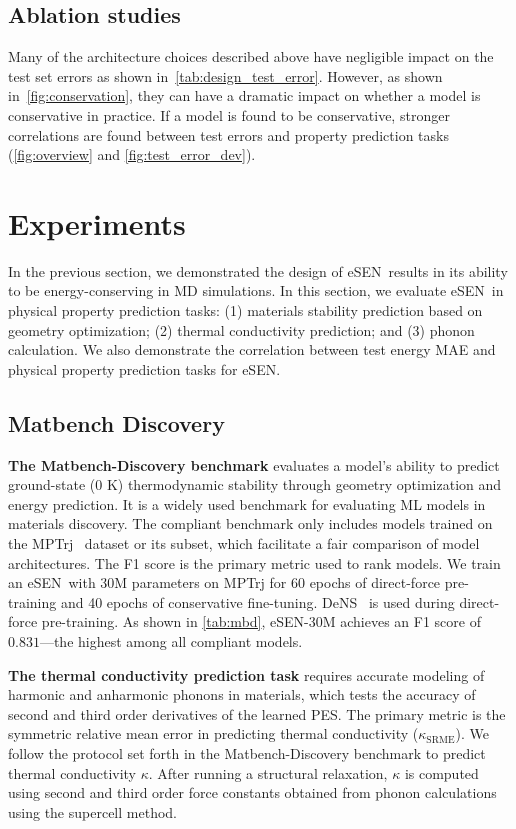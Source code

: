 \documentclass[twocolumn]{fairmeta}
\newcommand{\ourmodel}{eSEN}
\begin{document}
\subsection{Ablation studies}
Many of the architecture choices described above have negligible impact on the test set errors as shown in~\cref{tab:design_test_error}. However, as shown in~\cref{fig:conservation}, they can have a dramatic impact on whether a model is conservative in practice. If a model is found to be conservative, stronger correlations are found between test errors and property prediction tasks (\cref{fig:overview} and \cref{fig:test_error_dev}). 

\section{Experiments}
\label{sec:experiment}


In the previous section, we demonstrated the design of \ourmodel\ results in its ability to be energy-conserving in MD simulations. In this section, we evaluate \ourmodel\ in physical property prediction tasks: (1) materials stability prediction based on geometry optimization; (2) thermal conductivity prediction; and (3) phonon calculation. We also demonstrate the correlation between test energy MAE and physical property prediction tasks for \ourmodel.

\subsection{Matbench Discovery}
\textbf{The Matbench-Discovery benchmark} evaluates a model's ability to predict ground-state (0 K) thermodynamic stability through geometry optimization and energy prediction. It is a widely used benchmark for evaluating ML models in materials discovery. The compliant benchmark only includes models trained on the MPTrj~\citep{jain2013materials, deng2023chgnet} dataset or its subset, which facilitate a fair comparison of model architectures. The F1 score is the primary metric used to rank models. We train an \ourmodel\ with 30M parameters on MPTrj for 60 epochs of direct-force pre-training and 40 epochs of conservative fine-tuning. DeNS~\citep{liao2024generalizing} is used during direct-force pre-training. As shown in \cref{tab:mbd}, \ourmodel-30M achieves an F1 score of $0.831$---the highest among all compliant models.

\textbf{The thermal conductivity prediction task} requires accurate modeling of harmonic and anharmonic phonons in materials, which tests the accuracy of second and third order derivatives of the learned PES. The primary metric is the symmetric relative mean error in predicting thermal conductivity ($\kappa_{\mathrm{SRME}}$). We follow the protocol set forth in the Matbench-Discovery benchmark \cite{riebesell2023matbench, pota2024thermal} to predict thermal conductivity $\kappa$. After running a structural relaxation, $\kappa$ is computed using second and third order force constants obtained from phonon calculations using the supercell method. 
\end{document}

